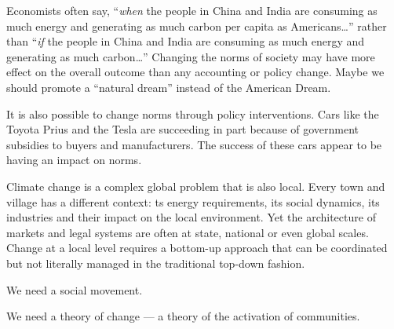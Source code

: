 Economists often say, ``\textit{when} the people in China and India are consuming as much energy and generating as much carbon per capita as Americans…'' rather than ``\textit{if} the people in China and India are consuming as much energy and generating as much carbon…'' Changing the norms of society may have more effect on the overall outcome than any accounting or policy change. Maybe we should promote a ``natural dream'' instead of the American Dream. 

It is also possible to change norms through policy interventions. Cars like the Toyota Prius and the Tesla are succeeding in part because of government subsidies to buyers and manufacturers. The success of these cars appear to be having an impact on norms.

Climate change is a complex global problem that is also local. Every town and village has a different context: ts energy requirements, its social dynamics, its industries and their impact on the local environment. Yet the architecture of markets and legal systems are often at state, national or even global scales. Change at a local level requires a bottom-up approach that can be coordinated but not literally managed in the traditional top-down fashion.

We need a social movement.

We need a theory of change --- a theory of the activation of communities. 